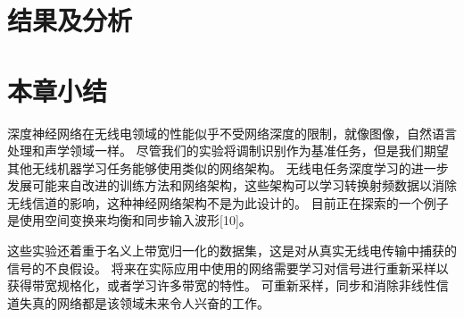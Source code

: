 \section{结果及分析}

\section{本章小结}
深度神经网络在无线电领域的性能似乎不受网络深度的限制，就像图像，自然语言处理和声学领域一样。 尽管我们的实验将调制识别作为基准任务，但是我们期望其他无线机器学习任务能够使用类似的网络架构。 无线电任务深度学习的进一步发展可能来自改进的训练方法和网络架构，这些架构可以学习转换射频数据以消除无线信道的影响，这种神经网络架构不是为此设计的。 目前正在探索的一个例子是使用空间变换来均衡和同步输入波形[10]。\par

这些实验还着重于名义上带宽归一化的数据集，这是对从真实无线电传输中捕获的信号的不良假设。 将来在实际应用中使用的网络需要学习对信号进行重新采样以获得带宽规格化，或者学习许多带宽的特性。 可重新采样，同步和消除非线性信道失真的网络都是该领域未来令人兴奋的工作。\par